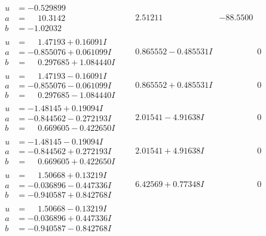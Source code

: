 \documentclass[1p]{elsarticle_modified}
\theoremstyle{definition}
\begin{document}
$$\begin{array}{c|c|c}
\begin{aligned}
u &= -0.529899\phantom{ +0.000000I} \\
a &= \phantom{-}10.3142\phantom{ +0.000000I} \\
b &= -1.02032\phantom{ +0.000000I}\end{aligned}
 & \phantom{-}2.51211\phantom{ +0.000000I} & -88.5500\phantom{ +0.000000I} \\ \hline\begin{aligned}
u &= \phantom{-}1.47193 + 0.16091 I \\
a &= -0.855076 + 0.061099 I \\
b &= \phantom{-}0.297685 + 1.084440 I\end{aligned}
 & \phantom{-}0.865552 - 0.485531 I & \phantom{-0.000000 } 0 \\ \hline\begin{aligned}
u &= \phantom{-}1.47193 - 0.16091 I \\
a &= -0.855076 - 0.061099 I \\
b &= \phantom{-}0.297685 - 1.084440 I\end{aligned}
 & \phantom{-}0.865552 + 0.485531 I & \phantom{-0.000000 } 0 \\ \hline\begin{aligned}
u &= -1.48145 + 0.19094 I \\
a &= -0.844562 - 0.272193 I \\
b &= \phantom{-}0.669605 - 0.422650 I\end{aligned}
 & \phantom{-}2.01541 - 4.91638 I & \phantom{-0.000000 } 0 \\ \hline\begin{aligned}
u &= -1.48145 - 0.19094 I \\
a &= -0.844562 + 0.272193 I \\
b &= \phantom{-}0.669605 + 0.422650 I\end{aligned}
 & \phantom{-}2.01541 + 4.91638 I & \phantom{-0.000000 } 0 \\ \hline\begin{aligned}
u &= \phantom{-}1.50668 + 0.13219 I \\
a &= -0.036896 - 0.447336 I \\
b &= -0.940587 + 0.842768 I\end{aligned}
 & \phantom{-}6.42569 + 0.77348 I & \phantom{-0.000000 } 0 \\ \hline\begin{aligned}
u &= \phantom{-}1.50668 - 0.13219 I \\
a &= -0.036896 + 0.447336 I \\
b &= -0.940587 - 0.842768 I\end{aligned}

\end{array}$$
\end{document}
